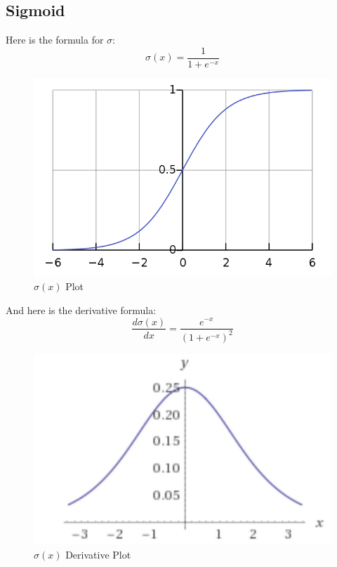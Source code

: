 \documentclass[a4paper, 11pt, fleqn]{article}
\begin{document}
\subsection{Sigmoid}
Here is the formula for $\sigma$: 
\begin{equation}
    \sigma(x) = \frac{1}{1 + e^{-x}}
\end{equation}

\begin{figure}[!htb]
    \centering
    \includegraphics[scale=0.3]{images/640px-Logistic-curve.png}
    \caption{$\sigma(x)$ Plot}
\end{figure}

And here is the derivative formula: 
\begin{equation}
    \frac{d \sigma(x)}{dx} =  \frac{e^{-x}}{(1 + e^{-x})^2}
\end{equation}

\begin{figure}[!htb]
    \centering
    \includegraphics[scale=0.8]{images/sigmoidderivative.JPG}
    \caption{$\sigma(x)$ Derivative Plot}
\end{figure}
\end{document}
